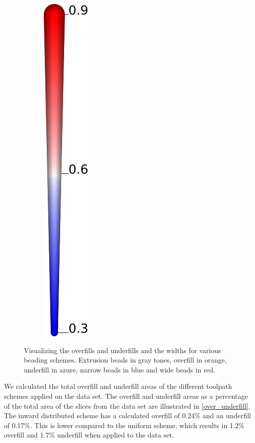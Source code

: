 \begin{figure}
\begin{subfigure}{.04\columnwidth}
\includegraphics[height=\figheight]{sources/validation/gMAT_example/widths_legend.png}
\end{subfigure}
\caption{
Visualizing the overfills and underfills and the widths for various beading schemes.
Extrusion beads in gray tones,
overfill in orange,
underfill in azure,
narrow beads in blue
and wide beads in red.
}
\label{visualized_accuracy}
\end{figure}


We calculated the total overfill and underfill areas of the different toolpath schemes applied on the data set. 
The overfill and underfill areas as a percentage of the total area of the slices from the data set are illustrated in \cref{over_underfill}.  
The inward distributed scheme has a calculated overfill of 0.24\% and an underfill of 0.17\%.
This is lower compared to the uniform scheme, which results in 1.2\% overfill and 1.7\% underfill when applied to the data set.

